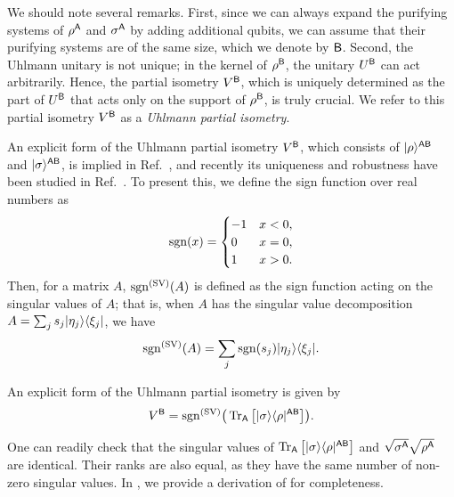 We should note several remarks. 
First, since we can always expand the purifying systems of $\rho^{\mathsf{A}}$ and $\sigma^{\mathsf{A}}$ by adding additional qubits, we can assume that their purifying systems are of the same size, which we denote by ${\mathsf{B}}$.
Second, the Uhlmann unitary is not unique; in the kernel of $\rho^{\mathsf{B}}$, the unitary $U^{\mathsf{B}}$ can act arbitrarily.
Hence, the partial isometry $V^{\mathsf{B}}$, which is uniquely determined as the part of $U^{\mathsf{B}}$ that acts only on the support of $\rho^{\mathsf{B}}$, is truly crucial.
We refer to this partial isometry $V^{\mathsf{B}}$ as a \emph{Uhlmann partial isometry}.

An explicit form of the Uhlmann partial isometry $V^{\mathsf{B}}$, which consists of $|\rho\rangle^{{\mathsf{A}}{\mathsf{B}}}$ and $|\sigma\rangle^{{\mathsf{A}}{\mathsf{B}}}$, is implied in Ref.~\cite{Jozsa1994FidelityforMixedQuantumStates}, and recently its uniqueness and robustness have been studied in Ref.~\cite{bostanci2025localtransformationsbipart}.
To present this, we define the sign function over real numbers as  
\begin{equation}
\mathrm{sgn}(x) = 
\begin{cases}
-1 & x<0, \\
0 & x=0, \\
1 & x>0.
\end{cases}
\end{equation}
Then, for a matrix $A$, $\mathrm{sgn}^{(\rm SV)}(A)$ is defined as the sign function acting on the singular values of $A$; that is, when $A$ has the singular value decomposition $A = \sum_j s_j |\eta_j\rangle\langle\xi_j|$, we have
\begin{align}
\label{inteq:158}
    \mathrm{sgn}^{(\rm SV)}(A) = \sum_j \mathrm{sgn}(s_j) |\eta_j\rangle\langle\xi_j|.
\end{align}



\begin{proposition}
\label{prop:explicit form of Uhl}
An explicit form of the Uhlmann partial isometry is given by 
\begin{align}
\label{eq:explicit form Uhl partial iso}
    V^{\mathsf{B}} = \mathrm{sgn}^{(\rm SV)}\big(\operatorname{Tr}_{\mathsf{A}}\big[|\sigma\rangle\langle\rho|^{{\mathsf{A}}{\mathsf{B}}}\big]\big).
\end{align}
\end{proposition}




One can readily check that the singular values of $\operatorname{Tr}_{\mathsf{A}}\big[|\sigma\rangle\langle\rho|^{{\mathsf{A}}{\mathsf{B}}}\big]$ and $\sqrt{\sigma^{\mathsf{A}}}\sqrt{\rho^{\mathsf{A}}}$ are identical.
Their ranks are also equal, as they have the same number of non-zero singular values.
In , we provide a derivation of  for completeness.




